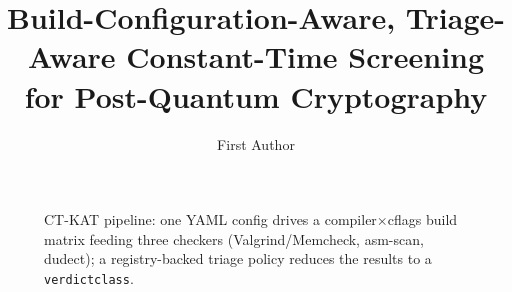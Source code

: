 \documentclass[runningheads]{llncs}
\renewcommand{\_}{\textunderscore\discretionary{}{}{}}
\begin{document}
\title{Build-Configuration-Aware, Triage-Aware Constant-Time Screening for
Post-Quantum Cryptography}

\author{First Author}

\maketitle

\begin{abstract}

\end{abstract}





\begin{figure}[htbp]
\centering
\resizebox{\textwidth}{!}{}
\caption{CT-KAT pipeline: one YAML config drives a compiler$\times$cflags build
matrix feeding three checkers (Valgrind/Memcheck, asm-scan, dudect); a
registry-backed triage policy reduces the results to a \texttt{verdict\_class}.}
\label{fig:pipeline}
\end{figure}




\end{document}
